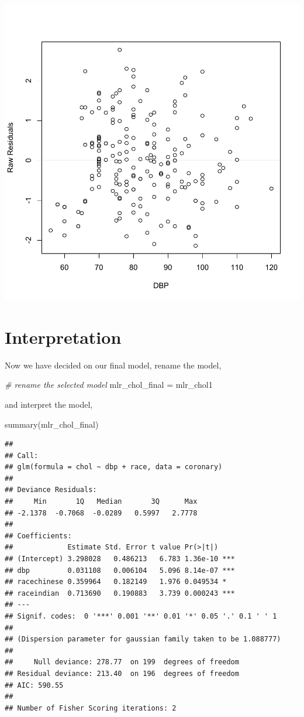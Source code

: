 \documentclass[
]{book}
\makeatletter
\newenvironment{Shaded}{\begin{snugshade}}{\end{snugshade}}
\newcommand{\CommentTok}[1]{\textcolor[rgb]{0.37,0.37,0.37}{\textit{#1}}}
\newcommand{\FunctionTok}[1]{\textcolor[rgb]{0,0,0}{#1}}
\newcommand{\NormalTok}[1]{#1}
\newcommand{\OtherTok}[1]{\textcolor[rgb]{0.37,0.37,0.37}{#1}}
\newenvironment{kframe}{%
\medskip{}
\setlength{\fboxsep}{.8em}
 \def\at@end@of@kframe{}%
 \ifinner\ifhmode%
  \def\at@end@of@kframe{\end{minipage}}%
  \begin{minipage}{\columnwidth}%
 \fi\fi%
 \def\FrameCommand##1{\hskip\@totalleftmargin \hskip-\fboxsep
 \colorbox{shadecolor}{##1}\hskip-\fboxsep
     \hskip-\linewidth \hskip-\@totalleftmargin \hskip\columnwidth}%
 \MakeFramed {\advance\hsize-\width
   \@totalleftmargin\z@ \linewidth\hsize
   \@setminipage}}%
 {\par\unskip\endMakeFramed%
 \at@end@of@kframe}
\renewenvironment{Shaded}{\begin{kframe}}{\end{kframe}}
\makeatother
\begin{document}
\begin{center}\includegraphics[width=0.7\linewidth,keepaspectratio]{Multivariable_Data_Analysis_files/figure-latex/unnamed-chunk-120-1} \end{center}

\hypertarget{interpretation-1}{%
\section{Interpretation}\label{interpretation-1}}

Now we have decided on our final model, rename the model,

\begin{Shaded}
\begin{Highlighting}[]
\CommentTok{\# rename the selected model}
\NormalTok{mlr\_chol\_final }\OtherTok{=}\NormalTok{ mlr\_chol1}
\end{Highlighting}
\end{Shaded}

and interpret the model,

\begin{Shaded}
\begin{Highlighting}[]
\FunctionTok{summary}\NormalTok{(mlr\_chol\_final)}
\end{Highlighting}
\end{Shaded}

\begin{verbatim}
## 
## Call:
## glm(formula = chol ~ dbp + race, data = coronary)
## 
## Deviance Residuals: 
##     Min       1Q   Median       3Q      Max  
## -2.1378  -0.7068  -0.0289   0.5997   2.7778  
## 
## Coefficients:
##             Estimate Std. Error t value Pr(>|t|)    
## (Intercept) 3.298028   0.486213   6.783 1.36e-10 ***
## dbp         0.031108   0.006104   5.096 8.14e-07 ***
## racechinese 0.359964   0.182149   1.976 0.049534 *  
## raceindian  0.713690   0.190883   3.739 0.000243 ***
## ---
## Signif. codes:  0 '***' 0.001 '**' 0.01 '*' 0.05 '.' 0.1 ' ' 1
## 
## (Dispersion parameter for gaussian family taken to be 1.088777)
## 
##     Null deviance: 278.77  on 199  degrees of freedom
## Residual deviance: 213.40  on 196  degrees of freedom
## AIC: 590.55
## 
## Number of Fisher Scoring iterations: 2
\end{verbatim}
\end{document}
